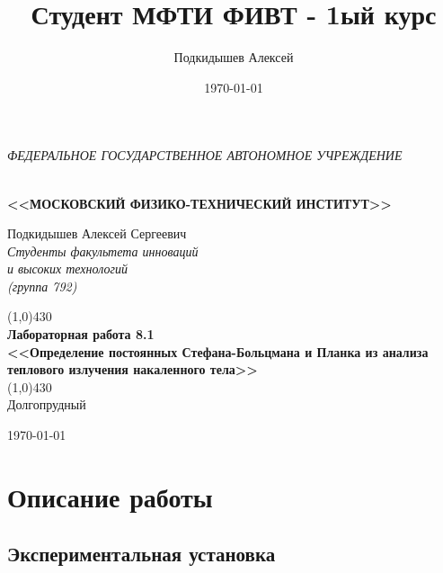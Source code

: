 \documentclass[a4paper,12pt]{article}
\author{Подкидышев Алексей}
\title{Студент МФТИ ФИВТ - 1ый курс}
\date{\today}
\theoremstyle{plain} %
\theoremstyle{definition} %
\theoremstyle{remark} %
\renewcommand{\headrulewidth}{0mm}  %
\begin{document}

\begin{center}
	\textit{\MakeTextUppercase{федеральное государственное автономное учреждение}}
		
	\vspace{0.5ex}
	
	\textbf{ \\ \MakeTextUppercase{<<Московский Физико-технический институт>>}}
\end{center}
\vspace{13ex}
\begin{flushright}
	\noindent
	{
	Подкидышев Алексей Сергеевич}
	\\
	\textit{Студенты факультета инноваций\\ и высоких технологий\\(группа 792)}
\end{flushright}
\begin{center}
	\vspace{23ex}
	\line(1,0){430}\\[4ex]
	{\LARGE\textbf{Лабораторная работа 8.1}}
	\vspace{2ex}\\
	\textbf{\large{<<Определение постоянных Стефана-Больцмана и Планка из анализа теплового излучения накаленного тела>>}}\\[3ex]
	\line(1,0){430}\\[5ex]
	\vfill
	Долгопрудный 
	
	{\today}
\end{center}

\newpage
\newpage
\renewcommand{\headrulewidth}{1pt}

\section{Описание работы}

\subsection{Экспериментальная установка}
\end{document}
